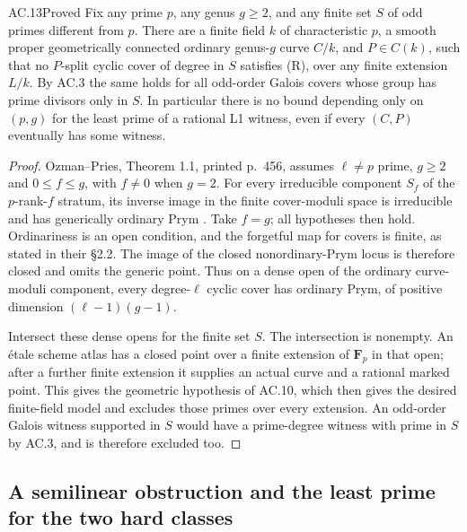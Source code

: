 \begin{claim}{AC.13}{Proved}
Fix any prime $p$, any genus $g\ge2$, and any finite set $S$ of odd
primes different from $p$.  There are a finite field $k$ of characteristic
$p$, a smooth proper geometrically connected ordinary genus-$g$ curve
$C/k$, and $P\in C(k)$, such that no $P$-split cyclic cover of degree
in $S$ satisfies (R), over any finite extension $L/k$.  By AC.3 the same
holds for all odd-order Galois covers whose group has prime divisors only
in $S$.  In particular there is no bound depending only on $(p,g)$ for
the least prime of a rational L1 witness, even if every $(C,P)$ eventually
has some witness.
\end{claim}
\begin{proof}
Ozman--Pries, Theorem 1.1, printed p.~456, assumes $\ell\ne p$ prime,
$g\ge2$ and $0\le f\le g$, with $f\ne0$ when $g=2$.
For every irreducible component $S_f$ of the $p$-rank-$f$ stratum,
its inverse image in the finite cover-moduli space is irreducible and
has generically ordinary Prym \cite{AC_OzmanPries2019}.  Take $f=g$;
all hypotheses then hold.  Ordinariness is an open condition, and the
forgetful map for covers is finite, as stated in their \S2.2.
The image of the closed nonordinary-Prym locus is therefore closed and
omits the generic point.  Thus on a dense open of the ordinary
curve-moduli component, every degree-$\ell$ cyclic cover has ordinary
Prym, of positive dimension $(\ell-1)(g-1)$.

Intersect these dense opens for the finite set $S$.  The intersection
is nonempty.  An \'etale scheme atlas has a closed point over a finite
extension of $\mathbf F_p$ in that open; after a further finite extension
it supplies an actual curve and a rational marked point.  This gives the
geometric hypothesis of AC.10, which then gives the desired finite-field
model and excludes those primes over every extension.  An odd-order
Galois witness supported in $S$ would have a prime-degree witness with
prime in $S$ by AC.3, and is therefore excluded too.
\end{proof}

\subsection{A semilinear obstruction and the least prime for the two hard classes}

